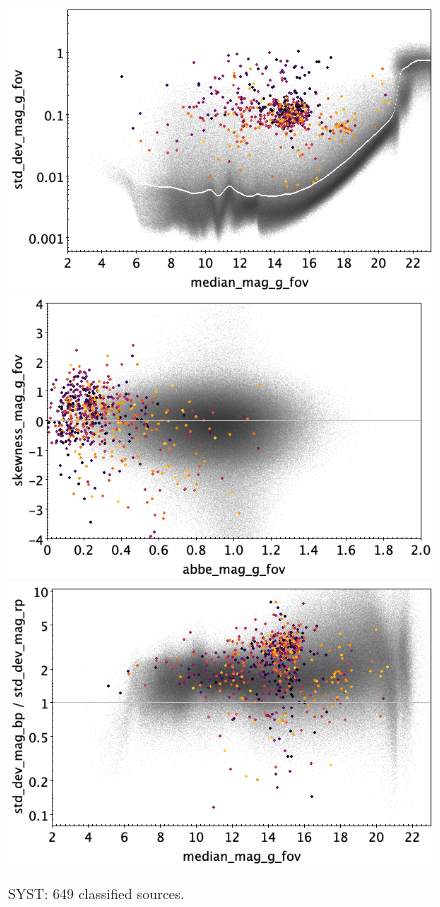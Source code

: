 \documentclass[longauth]{aa}
\begin{document}
\begin{appendix}
\begin{figure}
\hspace{2mm}
 \includegraphics[width=0.45\hsize]{figures/appendix/SYST_cls_msd.png} \\ %
\vspace{4mm}
 \includegraphics[width=0.45\hsize]{figures/appendix/SYST_cls_ask.png}  %
\hspace{2mm}
 \includegraphics[width=0.45\hsize]{figures/appendix/SYST_cls_msdr.png}  \\ %
\vspace{4mm}
 \caption{SYST: 649 classified sources.}  
 \label{fig:app:SYST}
\end{figure}


\end{appendix}
\end{document}
